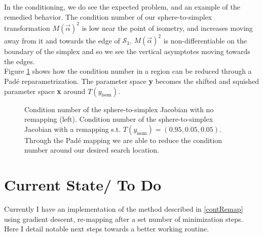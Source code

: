 \documentclass[10pt]{article}
\begin{document}
In the conditioning, we do see the expected problem, and an example of the remedied behavior. The condition number of our sphere-to-simplex transformation $M(\vec{\alpha})^2$ is low near the point of isometry, and increases moving away from it and towards the edge of $\mathcal{S}_3$. $M(\vec{\alpha})^2$ is non-differentiable on the boundary of the simplex and so we see the vertical asymptotes moving towards the edges.\\
Figure \ref{condFig} shows how the condition number in a region can be reduced through a Pad\'{e} reparametrization. The parameter space \textbf{y} becomes the shifted and squished parameter space \textbf{x} around $T(y_\text{isom})$.

\begin{figure}[H]
	\centering
	\qquad
	\caption{Condition number of the sphere-to-simplex Jacobian with no remapping (left). Condition number of the sphere-to-simplex Jacobian with a remapping s.t. $T(y_\text{isom}) = (0.95, 0.05, 0.05)$. Through the Pad\'{e} mapping we are able to reduce the condition number around our desired search location.}
	\label{condFig}
\end{figure}




\newpage 
\section{Current State/ To Do}

Currently I have an implementation of the method described in \ref{contRemap} using gradient descent, re-mapping after a set number of minimization steps. Here I detail notable next steps towards a better working routine.
\end{document}
